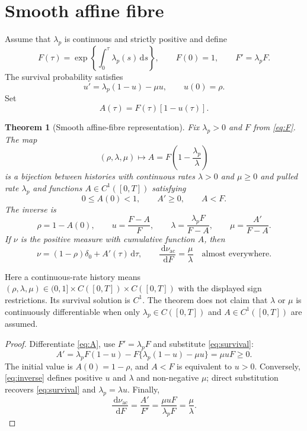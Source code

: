 \documentclass[11pt]{article}
\newtheorem{theorem}{Theorem}
\theoremstyle{definition}
\newcommand{\dd}{\,\mathrm{d}}
\newcommand{\ac}{\mathrm{ac}}
\begin{document}
\section{Smooth affine fibre}
Assume that $\lambda_p$ is continuous and strictly positive and define
\begin{equation}
 F(\tau)=\exp\!\left\{\int_0^\tau\lambda_p(s)\dd s\right\},
 \qquad F(0)=1,\qquad F'=\lambda_pF. \label{eq:F}
\end{equation}
The survival probability satisfies
\begin{equation}
 u'=\lambda_p(1-u)-\mu u,\qquad u(0)=\rho. \label{eq:survival}
\end{equation}
Set
\begin{equation}
 A(\tau)=F(\tau)[1-u(\tau)]. \label{eq:A}
\end{equation}

\begin{theorem}[Smooth affine-fibre representation]\label{thm:smooth}
Fix $\lambda_p>0$ and $F$ from \eqref{eq:F}. The map
\[
 (\rho,\lambda,\mu)\longmapsto A=F\left(1-\frac{\lambda_p}{\lambda}\right)
\]
is a bijection between histories with continuous rates $\lambda>0$ and $\mu\geq0$ and pulled rate $\lambda_p$ and functions $A\in C^1([0,T])$ satisfying
\[
 0\leq A(0)<1,\qquad A'\geq0,\qquad A<F.
\]
The inverse is
\begin{equation}
 \rho=1-A(0),\qquad u=\frac{F-A}{F},\qquad
 \lambda=\frac{\lambda_pF}{F-A},\qquad \mu=\frac{A'}{F-A}. \label{eq:inverse}
\end{equation}
If $\nu$ is the positive measure with cumulative function $A$, then
\begin{equation}
 \nu=(1-\rho)\delta_0+A'(\tau)\dd\tau,
 \qquad \frac{\dd\nu_{\ac}}{\dd F}=\frac{\mu}{\lambda}
 \quad\text{almost everywhere}. \label{eq:RN}
\end{equation}
\end{theorem}

Here a continuous-rate history means $(\rho,\lambda,\mu)\in(0,1]\times C([0,T])\times C([0,T])$ with the displayed sign restrictions. Its survival solution is $C^1$. The theorem does not claim that $\lambda$ or $\mu$ is continuously differentiable when only $\lambda_p\in C([0,T])$ and $A\in C^1([0,T])$ are assumed.

\begin{proof}
Differentiate \eqref{eq:A}, use $F'=\lambda_pF$ and substitute \eqref{eq:survival}:
\[
 A'=\lambda_pF(1-u)-F\{\lambda_p(1-u)-\mu u\}=\mu uF\geq0.
\]
The initial value is $A(0)=1-\rho$, and $A<F$ is equivalent to $u>0$. Conversely, \eqref{eq:inverse} defines positive $u$ and $\lambda$ and non-negative $\mu$; direct substitution recovers \eqref{eq:survival} and $\lambda_p=\lambda u$. Finally,
\[
 \frac{\dd\nu_{\ac}}{\dd F}=\frac{A'}{F'}=\frac{\mu uF}{\lambda_pF}=\frac{\mu}{\lambda}.
\]
\end{proof}
\end{document}
